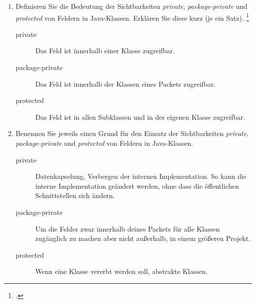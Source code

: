 \documentclass{lehramt-informatik-aufgabe}
\begin{document}

\begin{enumerate}


\item Definieren Sie die Bedeutung der Sichtbarkeiten \emph{private},
\emph{package-private} und \emph{protected} von Feldern in Java-Klassen.
Erklären Sie diese kurz (je ein Satz).
\footcite{examen:66116:2021:03}

\begin{liAntwort}
\begin{description}
\item[private]
Das Feld ist innerhalb einer Klasse zugreifbar.

\item[package-private]
Das Feld ist innerhalb der Klassen eines Packets zugreifbar.

\item[protected]
Das Feld ist in allen Subklassen und in der eigenen Klasse zugreifbar.

\end{description}
\end{liAntwort}


\item Benennen Sie jeweils einen Grund für den Einsatz der
Sichtbarkeiten \emph{private}, \emph{package-private} und
\emph{protected} von Feldern in Java-Klassen.

\begin{liAntwort}
\begin{description}
\item[private]

Datenkapselung, Verbergen der internen Implementation. So kann die
interne Implementation geändert werden, ohne dass die öffentlichen
Schnittstellen sich ändern.

\item[package-private]

Um die Felder zwar innerhalb deines Packets für alle Klassen zugänglich
zu machen aber nicht außerhalb, \zB in einem größeren Projekt.

\item[protected]

Wenn eine Klasse vererbt werden soll, \zB abstrakte Klassen.
\end{description}
\end{liAntwort}
\end{enumerate}
\end{document}
